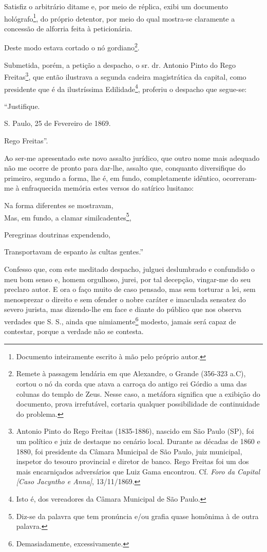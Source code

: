 Satisfiz o arbitrário ditame e, por meio de réplica, exibi um documento
hológrafo\footnote{Documento inteiramente escrito à mão pelo próprio
  autor.}, do próprio detentor, por meio do qual mostra-se claramente a
concessão de alforria feita à peticionária.

Deste modo estava cortado o nó gordiano\footnote{Remete à passagem
  lendária em que Alexandre, o Grande (356-323 a.C), cortou o nó da
  corda que atava a carroça do antigo rei Górdio a uma das colunas do
  templo de Zeus. Nesse caso, a metáfora significa que a exibição do
  documento, prova irrefutável, cortaria qualquer possibilidade de
  continuidade do problema.}.

Submetida, porém, a petição a despacho, o sr. dr. Antonio Pinto do Rego
Freitas\footnote{Antonio Pinto do Rego Freitas (1835-1886), nascido em
  São Paulo (SP), foi um político e juiz de destaque no cenário local.
  Durante as décadas de 1860 e 1880, foi presidente da Câmara Municipal
  de São Paulo, juiz municipal, inspetor do tesouro provincial e diretor
  de banco. Rego Freitas foi um dos mais encarniçados adversários que
  Luiz Gama encontrou. Cf. \emph{Foro da Capital {[}Caso Jacyntho e
  Anna{]}}, 13/11/1869.}, que então ilustrava a segunda cadeira
magistrática da capital, como presidente que é da ilustríssima
Edilidade\footnote{Isto é, dos vereadores da Câmara Municipal de São
  Paulo.}, proferiu o despacho que segue-se:

``Justifique.

S. Paulo, 25 de Fevereiro de 1869.

Rego Freitas''.

Ao ser-me apresentado este novo assalto jurídico, que outro nome mais
adequado não me ocorre de pronto para dar-lhe, assalto que, conquanto
diversifique do primeiro, segundo a forma, lhe é, em fundo,
completamente idêntico, ocorreram-me à enfraquecida memória estes versos
do satírico lusitano:

Na forma diferentes se mostravam,\\
Mas, em fundo, a clamar similcadentes\footnote{Diz-se da palavra que
  tem pronúncia e/ou grafia quase homônima à de outra palavra.},

Peregrinas doutrinas expendendo,

Transportavam de espanto às cultas gentes.''

Confesso que, com este meditado despacho, julguei deslumbrado e
confundido o meu bom senso e, homem orgulhoso, jurei, por tal decepção,
vingar-me do seu preclaro autor. E ora o faço muito de caso pensado, mas
sem torturar a lei, sem menosprezar o direito e sem ofender o nobre
caráter e imaculada sensatez do severo jurista, mas dizendo-lhe em face
e diante do público que nos observa verdades que S. S., ainda que
nimiamente\footnote{Demasiadamente, excessivamente.} modesto, jamais
será capaz de contestar, porque a verdade não se contesta.

